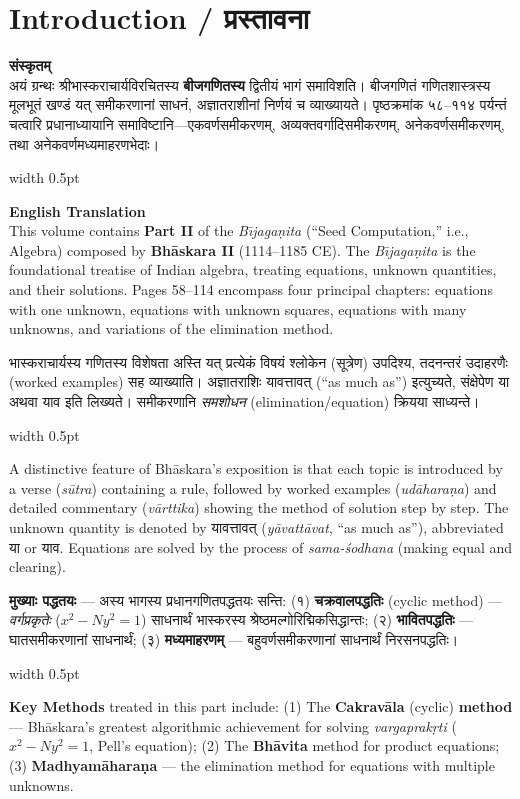 \documentclass[11pt,a4paper]{article}
\newcommand{\dev}[1]{{\devanagarifont #1}}
\newcommand{\vs}{\vspace{0.5em}}
\newcommand{\bilingual}[2]{%
  \par\vspace{0.5em}%
  \noindent\begin{minipage}[t]{0.47\textwidth}%
  \setlength{\parindent}{0pt}%
  \small #1%
  \end{minipage}%
  \hfill\textcolor{columnrule}{\vrule width 0.5pt}\hfill%
  \begin{minipage}[t]{0.47\textwidth}%
  \setlength{\parindent}{0pt}%
  \small\raggedright #2%
  \end{minipage}%
  \par\vspace{0.5em}%
}
\begin{document}
\tableofcontents
\newpage

\section*{Introduction / प्रस्तावना}

\bilingual{\textbf{संस्कृतम्}\\[0.5em]
अयं ग्रन्थः श्रीभास्कराचार्यविरचितस्य \textbf{बीजगणितस्य} द्वितीयं भागं समाविशति। बीजगणितं गणितशास्त्रस्य मूलभूतं खण्डं यत् समीकरणानां साधनं, अज्ञातराशीनां निर्णयं च व्याख्यायते। पृष्ठक्रमांक ५८--११४ पर्यन्तं चत्वारि प्रधानाध्यायानि समाविष्टानि—एकवर्णसमीकरणम्, अव्यक्तवर्गादिसमीकरणम्, अनेकवर्णसमीकरणम्, तथा अनेकवर्णमध्यमाहरणभेदाः।
}{%
\textbf{English Translation}\\[0.5em]
This volume contains \textbf{Part II} of the \textit{B\={\i}jaga\d{n}ita} (``Seed Computation,'' i.e., Algebra) composed by \textbf{Bh\={a}skara II} (1114--1185 CE). The \textit{B\={\i}jaga\d{n}ita} is the foundational treatise of Indian algebra, treating equations, unknown quantities, and their solutions. Pages 58--114 encompass four principal chapters: equations with one unknown, equations with unknown squares, equations with many unknowns, and variations of the elimination method.}

\vs

\bilingual{भास्कराचार्यस्य गणितस्य विशेषता अस्ति यत् प्रत्येकं विषयं श्लोकेन (सूत्रेण) उपदिश्य, तदनन्तरं उदाहरणैः (worked examples) सह व्याख्याति। अज्ञातराशिः \dev{यावत्तावत्} (``as much as'') इत्युच्यते, संक्षेपेण \dev{या} अथवा \dev{याव} इति लिख्यते। समीकरणानि \textit{समशोधन} (elimination/equation) क्रियया साध्यन्ते।
}{%
A distinctive feature of Bh\={a}skara's exposition is that each topic is introduced by a verse (\textit{s\={u}tra}) containing a rule, followed by worked examples (\textit{ud\={a}hara\d{n}a}) and detailed commentary (\textit{v\={a}rttika}) showing the method of solution step by step. The unknown quantity is denoted by \dev{यावत्तावत्} (\textit{y\={a}vatt\={a}vat}, ``as much as''), abbreviated \dev{या} or \dev{याव}. Equations are solved by the process of \textit{sama-\'{s}odhana} (making equal and clearing).}

\vs

\bilingual{\textbf{मुख्याः पद्धतयः} — अस्य भागस्य प्रधानगणितपद्धतयः सन्ति: (१) \textbf{चक्रवालपद्धतिः} (cyclic method) — \textit{वर्गप्रकृतेः} ($x^2 - Ny^2 = 1$) साधनार्थं भास्करस्य श्रेष्ठमल्गोरिद्मिकसिद्धान्तः; (२) \textbf{भावितपद्धतिः} — घातसमीकरणानां साधनार्थं; (३) \textbf{मध्यमाहरणम्} — बहुवर्णसमीकरणानां साधनार्थं निरसनपद्धतिः।
}{%
\textbf{Key Methods} treated in this part include: (1) The \textbf{Cakrav\={a}la} (cyclic) \textbf{method} --- Bh\={a}skara's greatest algorithmic achievement for solving \textit{vargaprak\d{r}ti} ($x^2 - Ny^2 = 1$, Pell's equation); (2) The \textbf{Bh\={a}vita} method for product equations; (3) \textbf{Madhyam\={a}hara\d{n}a} --- the elimination method for equations with multiple unknowns.}
\end{document}
